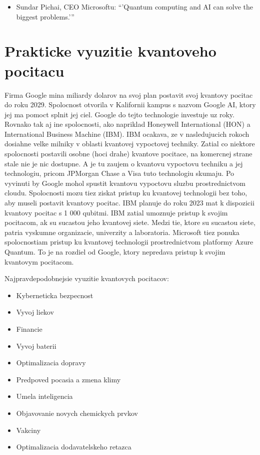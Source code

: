 \documentclass{article}
\begin{document}
\begin{itemize}
\item Sundar Pichai, CEO Microsoftu: \enquote{'Quantum computing and AI can solve the biggest problems.'}
\end{itemize}
\section{Prakticke vyuzitie kvantoveho pocitacu}
Firma Google mina miliardy dolarov na svoj plan postavit svoj kvantovy pocitac do roku 2029. Spolocnost otvorila v Kalifornii kampus s nazvom Google AI, ktory jej ma pomoct splnit jej ciel. Google do tejto technologie investuje uz roky. Rovnako tak aj ine spolocnosti, ako napriklad Honeywell International (HON) a International Business Machine (IBM). IBM ocakava, ze v nasledujucich rokoch dosiahne velke milniky v oblasti kvantovej vypoctovej techniky.
\bigbreak
Zatial co niektore spolocnosti postavili osobne (hoci drahe) kvantove pocitace, na komercnej strane stale nie je nic dostupne. A je tu zaujem o kvantovu vypoctovu techniku   a jej technologiu, pricom JPMorgan Chase a Visa tuto technologiu skumaju. Po vyvinuti by Google mohol spustit kvantovu vypoctovu sluzbu prostrednictvom cloudu.
\bigbreak
Spolocnosti mozu tiez ziskat pristup ku kvantovej technologii bez toho, aby museli postavit kvantovy pocitac. IBM planuje do roku 2023 mat k dispozicii kvantovy pocitac s 1 000 qubitmi. IBM zatial umoznuje pristup k svojim pocitacom, ak su sucastou jeho kvantovej siete. Medzi tie, ktore su sucastou siete, patria vyskumne organizacie, univerzity a laboratoria.
\bigbreak
Microsoft tiez ponuka spolocnostiam pristup ku kvantovej technologii prostrednictvom platformy Azure Quantum. To je na rozdiel od Google, ktory nepredava pristup k svojim kvantovym pocitacom.

\bigbreak
Najpravdepodobnejsie vyuzitie kvantovych pocitacov:
\begin{itemize}
\item Kyberneticka bezpecnost
\item Vyvoj liekov
\item Financie
\item Vyvoj baterii
\item Optimalizacia dopravy
\item Predpoved pocasia a zmena klimy
\item Umela inteligencia
\item Objavovanie novych chemickych prvkov
\item Vakciny
\item Optimalizacia dodavatelskeho retazca
\end{itemize}
\end{document}

